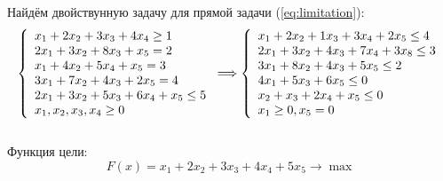 \documentclass[../body.tex]{subfiles}
\begin{document}
	Найдём двойствунную задачу для прямой задачи (\ref{eq:limitation}):	
	\begin{equation} \label{eq:dualtask}
		\left\{
		\begin{array}{ll} 
			x_1+2x_2+3x_3+4x_4 \ge 1\\
			2x_1+3x_2+8x_3+x_5=2\\
			x_1+4x_2+5x_4+x_5=3\\
			3x_1+7x_2+4x_3+2x_5 = 4\\
			2x_1+3x_2+5x_3+6x_4+x_5 \le 5\\
			x_1,x_2,x_3,x_4 \ge 0
		\end{array}\\
		\right.
		\Longrightarrow
		\left\{
		\begin{array}{ll} 
			x_1+2x_2+1x_3+3x_4+2x_5\le 4\\
			2x_1+3x_2+4x_3+7x_4+3x_8 \le 3\\
			3x_1+8x_2+4x_3+5x_5 \le 2\\
			4x_1+5x_3+6x_5 \le 0\\
			x_2+x_3+2x_4+x_5 \le 0\\
			x_1\ge 0, x_5 = 0
		\end{array}
		\right.	
	\end{equation}\\
	Функция цели: $$F(x)=x_1+2x_2+3x_3+4x_4+5x_5\longrightarrow \max
	$$
\end{document}
